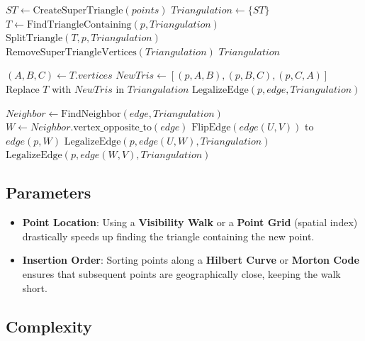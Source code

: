 \begin{algorithm}[htbp]
\caption{Incremental Delaunay Triangulation}
\label{alg:incremental_delaunay}
\begin{algorithmic}[1]
  \State $ST \gets \text{CreateSuperTriangle}(points)$
  \State $Triangulation \gets \{ST\}$
    \State $T \gets \text{FindTriangleContaining}(p, Triangulation)$
    \State $\text{SplitTriangle}(T, p, Triangulation)$
  \EndFor
  \State $\text{RemoveSuperTriangleVertices}(Triangulation)$
  \State \Return $Triangulation$
\EndFunction

  \State $(A, B, C) \gets T.vertices$
  \State $NewTris \gets [(p, A, B), (p, B, C), (p, C, A)]$
  \State Replace $T$ with $NewTris$ in $Triangulation$
    \State $\text{LegalizeEdge}(p, edge, Triangulation)$
  \EndFor
\EndFunction

  \State $Neighbor \gets \text{FindNeighbor}(edge, Triangulation)$
    \State \Return
  \EndIf
  \State $W \gets Neighbor.\text{vertex\_opposite\_to}(edge)$
    \State $\text{FlipEdge}(edge(U, V))$ to $edge(p, W)$
    \State $\text{LegalizeEdge}(p, edge(U, W), Triangulation)$
    \State $\text{LegalizeEdge}(p, edge(W, V), Triangulation)$
  \EndIf
\EndFunction
\end{algorithmic}
\end{algorithm}

\subsection{Parameters}

\begin{itemize}
\item \textbf{Point Location}: Using a \textbf{Visibility Walk} or a \textbf{Point Grid} (spatial index) drastically speeds up finding the triangle containing the new point.
\item \textbf{Insertion Order}: Sorting points along a \textbf{Hilbert Curve} or \textbf{Morton Code} ensures that subsequent points are geographically close, keeping the walk short.
\end{itemize}

\subsection{Complexity}

